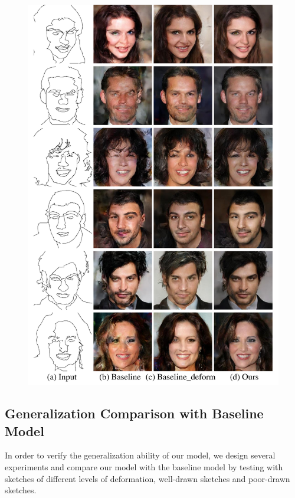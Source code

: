 \begin{figure}
	\includegraphics[width=0.9\linewidth]{figs/generalization_examples}
	\caption{}
	\label{fig:generative_quality}
\end{figure}

\subsection{Generalization Comparison with Baseline Model}

In order to verify the generalization ability of our model, we design several experiments and compare our model with the baseline model by testing with sketches of different levels of deformation, well-drawn sketches and poor-drawn sketches.

